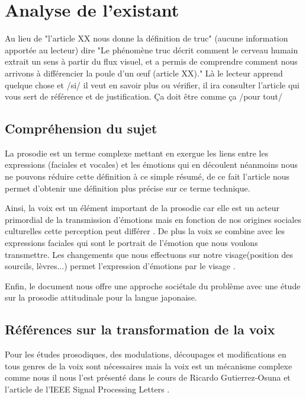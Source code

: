 \chapter{Analyse de l'existant}

 Au lieu de "l'article XX nous donne la définition de truc" (aucune
information apportée au lecteur) dire "Le phénomène truc décrit
comment le cerveau humain extrait un sens à partir du flux visuel, et a
permis de comprendre comment nous arrivons à différencier la poule
d'un œuf (article XX)." Là le lecteur apprend quelque chose et /si/ il
  veut en savoir plus ou vérifier, il ira consulter l'article qui vous
sert de référence et de justification. Ça doit être comme ça /pour
tout/


\section{Compréhension du sujet}\label{comprehension_sujet}

La prosodie est un terme complexe mettant en exergue les liens entre les expressions (faciales et vocales) et les émotions qui en découlent néanmoins nous ne pouvons réduire cette définition à ce simple résumé, de ce fait l'article \cite{bachorowski1999 vocaux} nous permet d'obtenir une définition plus précise sur ce terme technique.

Ainsi, la voix est un élément important de la prosodie car elle est un acteur primordial de la transmission d'émotions mais en fonction de nos origines sociales culturelles cette perception peut différer \cite{auberge2002prosodie}.
De plus la voix se combine avec les expressions faciales qui sont le portrait de l'émotion que nous voulons transmettre. Les changements que nous effectuons sur notre visage(position des sourcils, lèvres...) permet l'expression d'émotions par le visage \cite{ekman2003unmasking} .

Enfin, le document \cite{fourer:hal-00992083} nous offre une approche sociétale du problème avec une étude sur la prosodie attitudinale pour la langue japonaise.


\section{Références sur la transformation de la voix}\label{ref_transfo_voix}

Pour les études prosodiques, des modulations, découpages et modifications en tous genres de la voix sont nécessaires mais la voix est un mécanisme complexe comme nous il nous l'est présenté dans le cours de Ricardo Gutierrez-Osuna \cite{Gutierrez-Osuna:ISP-PMS} et l'article de l'IEEE Signal Processing Letters \cite{haagen1994transformation}.

